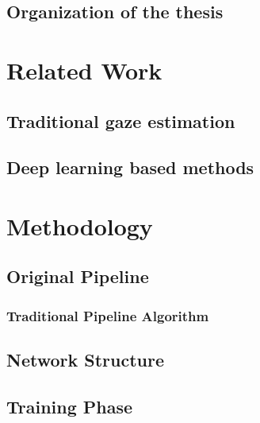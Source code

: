 \documentclass[senior]{IPSstyle}
\begin{document}


\section{Organization of the thesis}

\chapter{Related Work} \label{related_work}


\section{Traditional gaze estimation}
\section{Deep learning based methods}


\chapter{Methodology} \label{methodology}

\section{Original Pipeline}
\subsection{Traditional Pipeline Algorithm}

\section{Network Structure} \label{network structure}

\section{Training Phase} \label{training phase}
\end{document}
